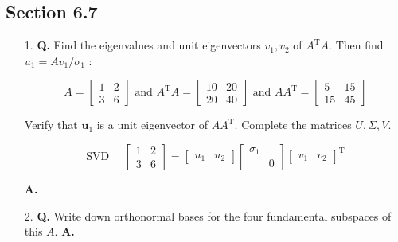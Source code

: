 \documentclass[main.tex]{subfiles}
\begin{document}
\subsection{Section 6.7}
\begin{enumerate}
    \item [1.] \textbf{Q.} Find the eigenvalues and unit eigenvectors $v_{1}, v_{2}$ of $A^{\mathrm{T}} A$. Then find $u_{1}=A v_{1} / \sigma_{1}$ : 
    
    $$
    A=\left[\begin{array}{ll}1 & 2 \\ 3 & 6\end{array}\right]  \text{ and } 
    A^{\mathrm{T}} A=\left[\begin{array}{ll}10 & 20 \\ 20 & 40\end{array}\right] \text{ and }
    AA^{\mathrm{T}}=\left[\begin{array}{rr}5 & 15 \\ 15 & 45\end{array}\right]
    $$ 
    
    Verify that $\boldsymbol{u}_{1}$ is a unit eigenvector of $A A^{\mathrm{T}}$. Complete the matrices $U, \Sigma, V$.
    
    $$
    \text{SVD } \quad
    \left[\begin{array}{ll}
    1 & 2 \\
    3 & 6
    \end{array}\right]=\left[\begin{array}{ll}
    u_{1} & u_{2}
    \end{array}\right]\left[\begin{array}{ll}
    \sigma_{1} & \\
    & 0
    \end{array}\right]\left[\begin{array}{ll}
    v_{1} & v_{2}
    \end{array}\right]^{\mathrm{T}}
    $$
    
    \textbf{A.}
    
    \item [2.] \textbf{Q.} Write down orthonormal bases for the four fundamental subspaces of this $A$. \textbf{A.}
    
\end{enumerate}
\end{document}
